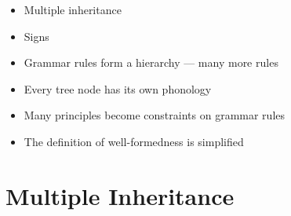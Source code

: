 \documentclass[a4paper,landscape,headrule,footrule]{foils}
\begin{document}

\begin{itemize}
\item Multiple inheritance
\item Signs
\item Grammar rules form a hierarchy --- many more rules
\item Every tree node has its own phonology
\item Many principles become constraints on 
grammar rules
\item The definition of well-formedness is 
simplified
\end{itemize}

\section[Multiple inheritance: lexemes and clauses]{Multiple Inheritance}

\newcommand{\twoline}[2]{\shortstack{\textit{#1}\\\textbf{#2}}}
\end{document}
